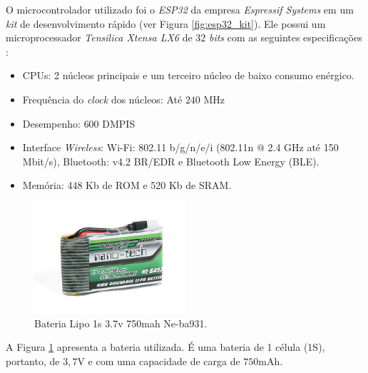 O microcontrolador utilizado foi o \emph{ESP32} da empresa \emph{Espressif Systems} em um \emph{kit} de desenvolvimento rápido (ver Figura \ref{fig:esp32_kit}). Ele possui um microprocessador \emph{Tensilica Xtensa LX6} de $32$ \emph{bits} com as seguintes especificações \cite{esp32:datasheet}:

\begin{itemize}
    \item CPUs: 2 núcleos principais e um terceiro núcleo de baixo consumo enérgico. 
    \item Frequência do \emph{clock} dos núcleos: Até $240$ MHz
    \item Desempenho: $600$ DMPIS
    \item Interface \emph{Wireless}: Wi-Fi: 802.11 b/g/n/e/i (802.11n @ 2.4 GHz até 150 Mbit/s), Bluetooth: v4.2 BR/EDR e Bluetooth Low Energy (BLE).
    \item Memória: 448 Kb de ROM e 520 Kb de SRAM.
\end{itemize}


\begin{figure}[H]
    \centering
    \includegraphics[width=0.5\textwidth]{figuras/eletronica/bateria.jpg}
    \caption{Bateria Lipo 1s 3.7v 750mah Ne-ba931.}
    \label{fig:bateria_lipo}
\end{figure}

A Figura \ref{fig:bateria_lipo} apresenta a bateria utilizada. É uma bateria de 1 célula (1S), portanto, de $3,7$V e com uma capacidade de carga de $750$mAh.
